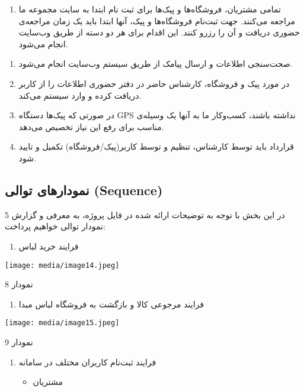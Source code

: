 \documentclass[]{article}
\begin{document}
\begin{enumerate}
\def\labelenumi{\arabic{enumi})}
\item
  تمامی مشتریان، فروشگاه‌ها و پیک‌ها برای ثبت نام ابتدا به سایت مجموعه
  ما مراجعه می‌کنند. جهت ثبت‌نام فروشگاه‌ها و پیک، آنها ابتدا باید یک
  زمان مراجعه‌ی حضوری دریافت و آن را رزرو کنند. این اقدام برای هر دو
  دسته از طریق وب‌سایت انجام می‌شود.
\end{enumerate}

\begin{enumerate}
\def\labelenumi{\arabic{enumi})}
\item
  صحت‌سنجی اطلاعات و ارسال پیامک از طریق سیستم وب‌سایت انجام می‌شود.
\item
  در مورد پیک و فروشگاه، کارشناس حاضر در دفتر حضوری اطلاعات را از کاربر
  دریافت کرده و وارد سیستم می‌کند.
\item
  در صورتی که پیک‌ها دستگاه GPS نداشته باشند، کسب‌وکار ما به آنها یک
  وسیله‌ی مناسب برای رفع این نیاز تخصیص می‌دهد.
\item
  قرارداد باید توسط کارشناس، تنظیم و توسط کاربر(پیک/فروشگاه) تکمیل و
  تایید شود.
\end{enumerate}

\subsection{نمودارهای توالی
(Sequence)}\label{ux646ux645ux648ux62fux627ux631ux647ux627ux6cc-ux62aux648ux627ux644ux6cc-sequence}

در این بخش با توجه به توضیحات ارائه شده در فایل پروژه، به معرفی و گزارش
5 نمودار توالی خواهیم پرداخت:

\begin{enumerate}
\def\labelenumi{\arabic{enumi})}
\item
  فرایند خرید لباس
\end{enumerate}

\texttt{[image: media/image14.jpeg]}

نمودار 8

\begin{enumerate}
\def\labelenumi{\arabic{enumi})}
\item
  فرایند مرجوعی کالا و بازگشت به فروشگاه لباس مبدا
\end{enumerate}

\texttt{[image: media/image15.jpeg]}

نمودار 9

\begin{enumerate}
\def\labelenumi{\arabic{enumi})}
\item
  فرایند ثبت‌نام کاربران مختلف در سامانه

  \begin{itemize}
  \item
    مشتریان
  \end{itemize}
\end{enumerate}
\end{document}
